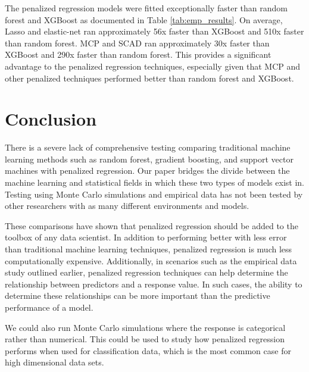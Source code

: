 \documentclass{article}
\begin{document}
	The penalized regression models were fitted exceptionally faster than random forest and XGBoost as documented in Table \ref{tab:emp_results}. On average, Lasso and elastic-net ran approximately 56x faster than XGBoost and 510x faster than random forest. MCP and SCAD ran approximately 30x faster than XGBoost and 290x faster than random forest. This provides a significant advantage to the penalized regression techniques, especially given that MCP and other penalized techniques performed better than random forest and XGBoost. 
	
	\section{Conclusion}\label{sec:conclusion}
	
	There is a severe lack of comprehensive testing comparing traditional machine learning methods such as random forest, gradient boosting, and support vector machines with penalized regression. Our paper bridges the divide between the machine learning and statistical fields in which these two types of models exist in. Testing using Monte Carlo simulations and empirical data has not been tested by other researchers with as many different environments and models.
	
	These comparisons have shown that penalized regression should be added to the toolbox of any data scientist. In addition to performing better with less error than traditional machine learning techniques, penalized regression is much less computationally expensive. Additionally, in scenarios such as the empirical data study outlined earlier, penalized regression techniques can help determine the relationship between predictors and a response value. In such cases, the ability to determine these relationships can be more important than the predictive performance of a model.
	
	We could also run Monte Carlo simulations where the response is categorical rather than numerical. This could be used to study how penalized regression performs when used for classification data, which is the most common case for high dimensional data sets.
	
\end{document}
